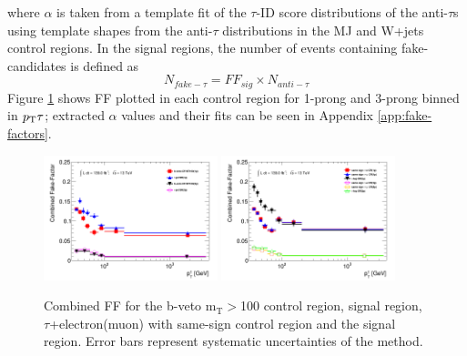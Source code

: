 		where $\alpha$ is taken from a template fit of the $\tau$-ID score distributions of the anti-$\tau$s using template shapes from the anti-$\tau$ distributions in the MJ and W+jets control regions. In the signal regions, the number of events containing fake-\tauhad candidates is defined as
		\begin{equation}\label{eqn:nfakethad}
			N_{fake-\tau} = FF_{sig} \times N_{anti-\tau} 
		\end{equation}
		Figure \ref{fig:FF_COM} shows \gls{FF} plotted in each control region for 1-prong and 3-prong \tauhad binned in $p_{\text{T}}{\tau}$; extracted $\alpha$ values and their fits can be seen in Appendix \ref{app:fake-factors}.
		\begin{figure}[h!]
		  \begin{center}
		    \includegraphics[width=0.45\textwidth]{chapters/chapter6_HPlus/images/FFs/FFs_COM_inclusive__taujet.png} \qquad
		    \includegraphics[width=0.45\textwidth]{chapters/chapter6_HPlus/images/FFs/FFs_COM_inclusive__taulep.png} 
		  \end{center}
		  \caption{
		Combined \gls{FF} for the \taujets b-veto $\mathrm{m_{T}}>$100 control region, \taujets signal region, $\tau$+electron(muon) with same-sign control region and the \taulep signal region. Error bars represent systematic uncertainties of the method. 
		}
		  \label{fig:FF_COM}
		\end{figure}


